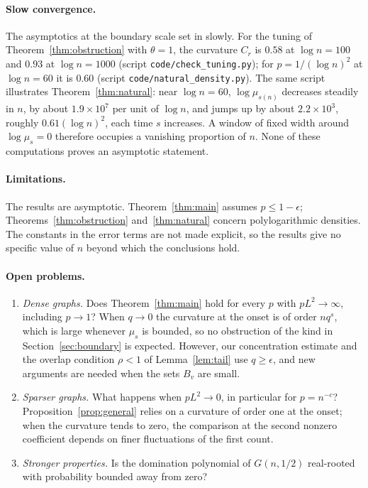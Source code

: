 \documentclass[11pt]{article}
\theoremstyle{remark}
\begin{document}
\paragraph{Slow convergence.} The asymptotics at the boundary scale set in slowly. For the tuning of Theorem~\ref{thm:obstruction} with $\theta=1$, the curvature $C_r$ is $0.58$ at $\log n=100$ and $0.93$ at $\log n=1000$ (script \texttt{code/check\_tuning.py}); for $p=1/(\log n)^2$ at $\log n=60$ it is $0.60$ (script \texttt{code/natural\_density.py}). The same script illustrates Theorem~\ref{thm:natural}: near $\log n=60$, $\log\mu_{s(n)}$ decreases steadily in $n$, by about $1.9\times10^7$ per unit of $\log n$, and jumps up by about $2.2\times10^3$, roughly $0.61(\log n)^2$, each time $s$ increases. A window of fixed width around $\log\mu_s=0$ therefore occupies a vanishing proportion of $n$. None of these computations proves an asymptotic statement.

\paragraph{Limitations.} The results are asymptotic. Theorem~\ref{thm:main} assumes $p\le1-\epsilon$; Theorems~\ref{thm:obstruction} and~\ref{thm:natural} concern polylogarithmic densities. The constants in the error terms are not made explicit, so the results give no specific value of $n$ beyond which the conclusions hold.

\paragraph{Open problems.}
\begin{enumerate}
\item \emph{Dense graphs.} Does Theorem~\ref{thm:main} hold for every $p$ with $pL^2\to\infty$, including $p\to1$? When $q\to0$ the curvature at the onset is of order $nq^s$, which is large whenever $\mu_s$ is bounded, so no obstruction of the kind in Section~\ref{sec:boundary} is expected. However, our concentration estimate and the overlap condition $\rho<1$ of Lemma~\ref{lem:tail} use $q\ge\epsilon$, and new arguments are needed when the sets $B_v$ are small.
\item \emph{Sparser graphs.} What happens when $pL^2\to0$, in particular for $p=n^{-c}$? Proposition~\ref{prop:general} relies on a curvature of order one at the onset; when the curvature tends to zero, the comparison at the second nonzero coefficient depends on finer fluctuations of the first count.
\item \emph{Stronger properties.} Is the domination polynomial of $G(n,1/2)$ real-rooted with probability bounded away from zero?
\end{enumerate}
\end{document}
